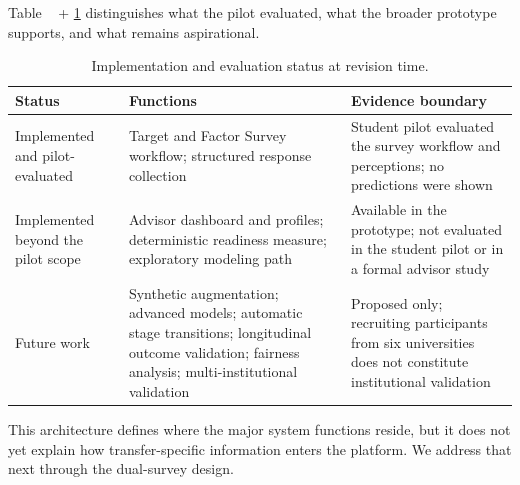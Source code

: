 \documentclass[letterpaper,11pt]{article}
\newcommand{\DIFadd}[1]{%
  \begingroup\setlength{\fboxsep}{0.5pt}%
  \colorbox{diffaddbg}{\textcolor{diffaddtext}{#1}}%
  \endgroup}
\newcommand{\DIFaddcite}[1]{%
  \DIFadd{+}\textcolor{diffaddtext}{#1}}
\begin{document}
\DIFadd{Table}~\DIFaddcite{\ref{tab:status} }\DIFadd{distinguishes} \DIFadd{what} \DIFadd{the} \DIFadd{pilot} \DIFadd{evaluated,} \DIFadd{what} \DIFadd{the} \DIFadd{broader} \DIFadd{prototype} \DIFadd{supports,} \DIFadd{and} \DIFadd{what} \DIFadd{remains} \DIFadd{aspirational.}

\begin{table}[htbp]
\caption{Implementation and evaluation status at revision time.}
\label{tab:status}
\centering
\begin{tabular}{@{}p{3.0cm}p{5.0cm}p{4.5cm}@{}}
\toprule
\textbf{Status} & \textbf{Functions} & \textbf{Evidence boundary} \\
\midrule
Implemented and pilot-evaluated & Target and Factor Survey workflow; structured response collection & Student pilot evaluated the survey workflow and perceptions; no predictions were shown \\
Implemented beyond the pilot scope & Advisor dashboard and profiles; deterministic readiness measure; exploratory modeling path & Available in the prototype; not evaluated in the student pilot or in a formal advisor study \\
Future work & Synthetic augmentation; advanced models; automatic stage transitions; longitudinal outcome validation; fairness analysis; multi-institutional validation & Proposed only; recruiting participants from six universities does not constitute institutional validation \\
\bottomrule
\end{tabular}
\end{table}

This architecture defines where the major system functions reside, but it does not yet explain how transfer-specific information enters the platform. We address that next through the dual-survey design.
\end{document}
